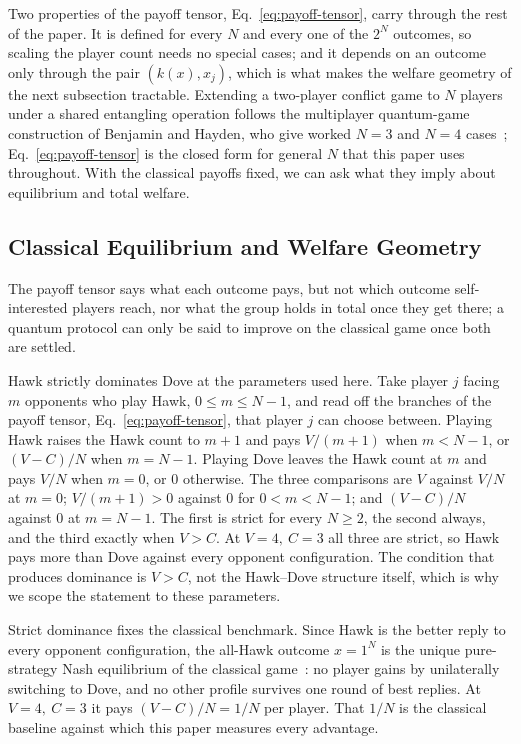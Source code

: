 \documentclass[conference,letterpaper,10pt]{IEEEtran}
\begin{document}
Two properties of the payoff tensor, Eq.~\eqref{eq:payoff-tensor}, carry through
the rest of the paper. It is defined for every $N$ and every one of the $2^N$
outcomes, so scaling the player count needs no special cases; and it depends on
an outcome only through the pair $(k(x),x_j)$, which is what makes the welfare
geometry of the next subsection tractable. Extending a two-player conflict game
to $N$ players under a shared entangling operation follows the multiplayer
quantum-game construction of Benjamin and Hayden, who give worked $N=3$ and
$N=4$ cases~\cite{benjamin2001}; Eq.~\eqref{eq:payoff-tensor} is the closed form
for general $N$ that this paper uses throughout. With the classical payoffs
fixed, we can ask what they imply about equilibrium and total welfare.

\subsection{Classical Equilibrium and Welfare Geometry}
\label{sec:classical-eq}
The payoff tensor says what each outcome pays, but not which outcome
self-interested players reach, nor what the group holds in total once they get
there; a quantum protocol can only be said to improve on the classical game
once both are settled.

Hawk strictly dominates Dove at the parameters used here. Take player $j$ facing $m$
opponents who play Hawk, $0\le m\le N-1$, and read off the branches of the
payoff tensor, Eq.~\eqref{eq:payoff-tensor}, that player $j$ can choose between.
Playing Hawk raises the Hawk count to $m+1$ and pays $V/(m+1)$ when $m<N-1$, or
$(V-C)/N$ when $m=N-1$. Playing Dove leaves the Hawk count at $m$ and pays $V/N$
when $m=0$, or $0$ otherwise. The three comparisons are $V$ against $V/N$ at
$m=0$; $V/(m+1)>0$ against $0$ for $0<m<N-1$; and $(V-C)/N$ against $0$ at
$m=N-1$. The first is strict for every $N\ge2$, the second always, and the third
exactly when $V>C$. At $V=4,\ C=3$ all three are strict, so Hawk pays more
than Dove against every opponent configuration. The condition that produces
dominance is $V>C$, not the Hawk--Dove structure itself, which is why we scope
the statement to these parameters.

Strict dominance fixes the classical benchmark. Since Hawk is the better reply
to every opponent configuration, the all-Hawk outcome $x=1^N$ is the unique
pure-strategy Nash equilibrium of the classical game~\cite{nash1951}: no player
gains by unilaterally switching to Dove, and no other profile survives one round
of best replies. At $V=4,\ C=3$ it pays $(V-C)/N=1/N$ per player. That $1/N$
is the classical baseline against which this paper measures every advantage.
\end{document}
